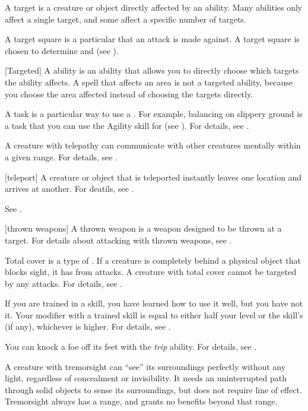  A target is a creature or object directly affected by an ability.
Many abilities only affect a single target, and some affect a specific number of targets.

 A target square is a particular  that an attack is made against.
A target square is chosen to determine  and  (see ).

[Targeted] A  ability is an ability that allows you to directly choose which targets the ability affects.
A spell that affects an area is not a targeted ability, because you choose the area affected instead of choosing the targets directly.

 A task is a particular way to use a .
For example, balancing on slippery ground is a task that you can use the Agility skill for (see ).
For details, see .

 A creature with telepathy can communicate with other creatures mentally within a given range.
For details, see .

[teleport] A creature or object that is teleported instantly leaves one location and arrives at another.
For deatils, see .

 See .

[thrown weapons] A thrown weapon is a weapon designed to be thrown at a target.
For details about attacking with thrown weapons, see .

 Total cover is a type of .
If a creature is completely behind a physical object that blocks sight, it has  from attacks.
A creature with total cover cannot be targeted by any attacks.
For details, see .

 If you are trained in a skill, you have learned how to use it well, but you have not  it.
Your modifier with a trained skill is equal to either half your level  or the skill's  (if any), whichever is higher.
For details, see .

 You can knock a foe off its feet with the \textit{trip} ability.
For details, see .

 A creature with tremorsight can ``see'' its surroundings perfectly without any light, regardless of concealment or invisibility.
It needs an uninterrupted path through solid objects to sense its surroundings, but does not require line of effect.
Tremorsight always has a range, and grants no benefits beyond that range.

